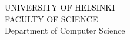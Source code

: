 \documentclass[portrait,a0]{a0poster}
\begin{document}
\begin{minipage}[t]{.98\linewidth} %
\vspace{0pt} %
\begin{flushright}
\begin{spacing}{5}
{\huge{}\textcolor{black}{\MakeUppercase{University of Helsinki}} \MakeUppercase{}}\\
{\huge{}\textcolor{facultyColor}{\MakeUppercase{Faculty of Science}} \MakeUppercase{}}\\
{\Large{}\textcolor{facultyColor}{{Department of Computer Science}}{}}\\
\end{spacing}
\end{flushright}
\hspace{50pt}

\end{minipage} %


\end{document}
